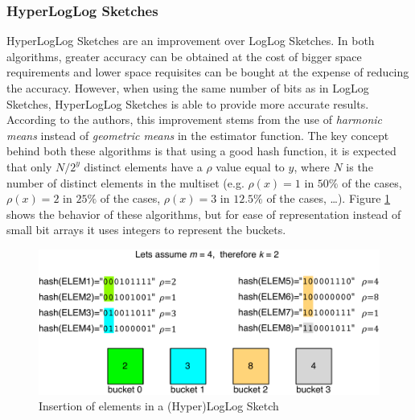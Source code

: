 \subsubsection{HyperLogLog Sketches}
\label{sec:hyperloglog-sketches}
HyperLogLog Sketches \cite{Fusy:2007um} are an improvement over LogLog
Sketches. In both algorithms, greater accuracy can be obtained at the
cost of bigger space requirements and lower space requisites can be
bought at the expense of reducing the accuracy. However, when using the same
number of bits as in LogLog Sketches, HyperLogLog Sketches is able to
provide more accurate results. According to the authors, this
improvement stems from the use of \emph{harmonic means} instead of
\emph{geometric means} in the estimator function. The key concept
behind both these algorithms is that using a good hash function, it is
expected that only $N/2^y$ distinct elements have a $\rho$ value equal
to $y$, where $N$ is the number of distinct elements in the multiset
(e.g. $\rho(x)=1$ in $50\%$ of the cases, $\rho(x)=2$ in $25\%$ of the
cases, $\rho(x)=3$ in $12.5\%$ of the cases, \ldots). Figure
\ref{fig:hyperloglog_sketches} shows the behavior of these algorithms,
but for ease of representation instead of small bit arrays it uses
integers to represent the buckets. 
\begin{figure}[htb]
  \centering
  \includegraphics[width=\textwidth]{images/hll_sketches.pdf}
  \caption{Insertion of elements in a (Hyper)LogLog Sketch}
  \label{fig:hyperloglog_sketches}
\end{figure}

